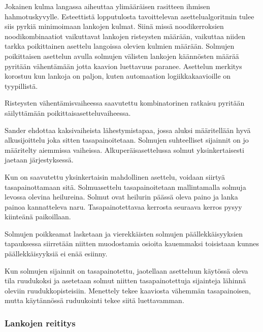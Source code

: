 \documentclass[finnish,12pt]{article}
\begin{document}
Jokainen kulma langassa aiheuttaa ylimääräisen rasitteen ihmisen hahmotuskyvylle. \cite{RefWorks:47}
Esteettistä lopputulosta tavoittelevan asettelualgoritmin tulee siis pyrkiä minimoimaan lankojen kulmat.
Siinä missä noodikerroksien noodikombinaatiot vaikuttavat lankojen risteysten määrään, vaikuttaa niiden tarkka poikittainen asettelu langoissa olevien kulmien määrään.
Solmujen poikittaisen asettelun avulla solmujen välisten lankojen käännösten määrää pyritään vähentämään jotta kaavion luettavuus paranee.
Asettelun merkitys korostuu kun lankoja on paljon, kuten automaation logiikkakaavioille on tyypillistä.

Risteysten vähentämisvaiheessa saavutettu kombinatorinen ratkaisu pyritään säilyttämään poikittaisasetteluvaiheessa.


\cite{RefWorks:49}

Sander ehdottaa kaksivaiheista lähestymistapaa, jossa aluksi määritellään hyvä alkusijoittelu joka sitten tasapainoitetaan.
Solmujen suhteelliset sijainnit on jo määritelty aiemmissa vaiheissa.
Alkuperäisasettelussa solmut yksinkertaisesti jaetaan järjestyksessä.

Kun on saavutettu yksinkertaisin mahdollinen asettelu, voidaan siirtyä tasapainottamaan sitä.
Solmuasettelu tasapainoitetaan mallintamalla solmuja levossa olevina heilureina.
Solmut ovat heilurin päässä oleva paino ja lanka painoa kannatteleva naru.
Tasapainotettavaa kerrosta seuraava kerros pysyy kiinteänä paikoillaan.

Solmujen poikkeamat lasketaan ja vierekkäisten solmujen päällekkäisyyksien tapauksessa siirretään niitten muodostamia osioita kauemmaksi toisistaan kunnes päällekkäisyyksiä ei enää esiinny.





Kun solmujen sijainnit on tasapainotettu, jaotellaan asetteluun käytössä oleva tila ruudukoksi ja asetetaan solmut niitten tasapainotettuja sijainteja lähinnä oleviin ruudukkopisteisiin.
Menettely tekee kaaviosta vähemmän tasapainoisen, mutta käytännössä ruduukointi tekee siitä luettavamman.

		\subsubsection{Lankojen reititys}
\end{document}
